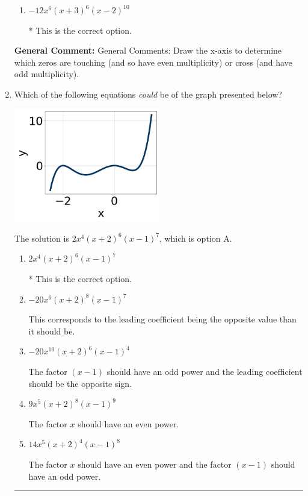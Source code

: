 \documentclass{extbook}[14pt]
\newcommand{\litem}[1]{\item #1

\rule{\textwidth}{0.4pt}}
\begin{document}
\begin{enumerate}
{\begin{enumerate}[label=\Alph*.]
This corresponds to the leading coefficient being the opposite value than it should be.
\item \( -12x^{6} (x + 3)^{6} (x - 2)^{10} \)

* This is the correct option.
\end{enumerate}

\textbf{General Comment:} General Comments: Draw the x-axis to determine which zeros are touching (and so have even multiplicity) or cross (and have odd multiplicity).
}
\litem{
Which of the following equations \textit{could} be of the graph presented below?

\begin{center}
    \includegraphics[width=0.5\textwidth]{../Figures/polyGraphToFunctionC.png}
\end{center}




The solution is \( 2x^{4} (x + 2)^{6} (x - 1)^{7} \), which is option A.\begin{enumerate}[label=\Alph*.]
\item \( 2x^{4} (x + 2)^{6} (x - 1)^{7} \)

* This is the correct option.
\item \( -20x^{6} (x + 2)^{8} (x - 1)^{7} \)

This corresponds to the leading coefficient being the opposite value than it should be.
\item \( -20x^{10} (x + 2)^{6} (x - 1)^{4} \)

The factor $(x - 1)$ should have an odd power and the leading coefficient should be the opposite sign.
\item \( 9x^{5} (x + 2)^{8} (x - 1)^{9} \)

The factor $x$ should have an even power.
\item \( 14x^{5} (x + 2)^{4} (x - 1)^{8} \)

The factor $x$ should have an even power and the factor $(x - 1)$ should have an odd power.
\end{enumerate}

}
\end{enumerate}
\end{document}
